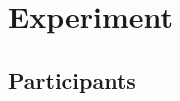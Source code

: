 



\section{Experiment}\label{Section:Experiment}

\subsection{Participants} \label{Participants}

